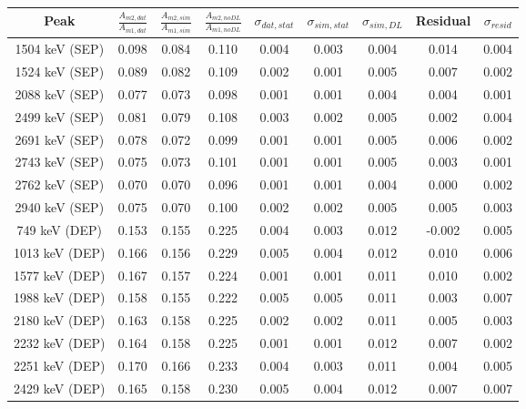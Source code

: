 \begin{tabular}{|c|c c c|c c c|c c|}
\hline
  Peak & $\frac{A_{m2,dat}}{A_{m1,dat}}$ & $\frac{A_{m2,sim}}{A_{m1,sim}}$ & $\frac{A_{m2,noDL}}{A_{m1,noDL}}$ & $\sigma_{dat,stat}$ & $\sigma_{sim,stat}$ & $\sigma_{sim,DL}$ & Residual & $\sigma_{resid}$ \\
\hline
  1504 keV (SEP) & 0.098 & 0.084 & 0.110 & 0.004 & 0.003 & 0.004 & 0.014 & 0.004 \\
  1524 keV (SEP) & 0.089 & 0.082 & 0.109 & 0.002 & 0.001 & 0.005 & 0.007 & 0.002 \\
  2088 keV (SEP) & 0.077 & 0.073 & 0.098 & 0.001 & 0.001 & 0.004 & 0.004 & 0.001 \\
  2499 keV (SEP) & 0.081 & 0.079 & 0.108 & 0.003 & 0.002 & 0.005 & 0.002 & 0.004 \\
  2691 keV (SEP) & 0.078 & 0.072 & 0.099 & 0.001 & 0.001 & 0.005 & 0.006 & 0.002 \\
  2743 keV (SEP) & 0.075 & 0.073 & 0.101 & 0.001 & 0.001 & 0.005 & 0.003 & 0.001 \\
  2762 keV (SEP) & 0.070 & 0.070 & 0.096 & 0.001 & 0.001 & 0.004 & 0.000 & 0.002 \\
  2940 keV (SEP) & 0.075 & 0.070 & 0.100 & 0.002 & 0.002 & 0.005 & 0.005 & 0.003 \\
  749 keV (DEP) & 0.153 & 0.155 & 0.225 & 0.004 & 0.003 & 0.012 & -0.002 & 0.005 \\
  1013 keV (DEP) & 0.166 & 0.156 & 0.229 & 0.005 & 0.004 & 0.012 & 0.010 & 0.006 \\
  1577 keV (DEP) & 0.167 & 0.157 & 0.224 & 0.001 & 0.001 & 0.011 & 0.010 & 0.002 \\
  1988 keV (DEP) & 0.158 & 0.155 & 0.222 & 0.005 & 0.005 & 0.011 & 0.003 & 0.007 \\
  2180 keV (DEP) & 0.163 & 0.158 & 0.225 & 0.002 & 0.002 & 0.011 & 0.005 & 0.003 \\
  2232 keV (DEP) & 0.164 & 0.158 & 0.225 & 0.001 & 0.001 & 0.012 & 0.007 & 0.002 \\
  2251 keV (DEP) & 0.170 & 0.166 & 0.233 & 0.004 & 0.003 & 0.011 & 0.004 & 0.005 \\
  2429 keV (DEP) & 0.165 & 0.158 & 0.230 & 0.005 & 0.004 & 0.012 & 0.007 & 0.007 \\
\hline
\end{tabular}
